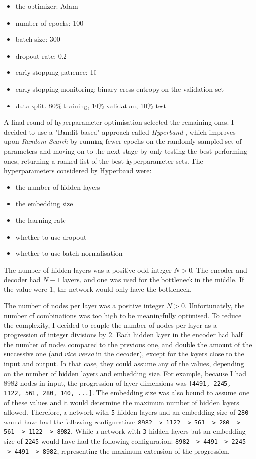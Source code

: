 \begin{itemize}
  \item the optimizer: Adam
  \item number of epochs: 100
  \item batch size: 300
  \item dropout rate: 0.2
  \item early stopping patience: 10
  \item early stopping monitoring: binary cross-entropy on the validation set
  \item data split: 80\% training, 10\% validation, 10\% test
\end{itemize}

A final round of hyperparameter optimisation selected the remaining ones.
I decided to use a "Bandit-based" approach
called \textit{Hyperband} \cite{DBLP:journals/corr/LiJDRT16}, which improves upon \textit{Random Search}
by running fewer epochs on the randomly sampled set of parameters
and moving on to the next stage by only testing the best-performing ones, returning a ranked list of the best hyperparameter sets.
The hyperparameters considered by Hyperband were:

\begin{itemize}
  \item the number of hidden layers
  \item the embedding size
  \item the learning rate
  \item whether to use dropout
  \item whether to use batch normalisation
\end{itemize}

The number of hidden layers was a positive odd integer $N > 0$.
The encoder and decoder had $N-1$ layers, and one was used for the bottleneck in the middle.
If the value were $1$, the network would only have the bottleneck.

The number of nodes per layer was a positive integer $N > 0$. Unfortunately, the number of combinations was too high to be
meaningfully optimised. To reduce the complexity, I decided to couple the number of nodes per layer as a progression
of integer divisions by 2.
Each hidden layer in the encoder had half the number of nodes compared to the previous one, and double the amount of the successive one
(and \textit{vice versa} in the decoder), except for the layers close to the input and output.
In that case, they could assume any of the values, depending on the number of hidden layers and embedding size.
For example, because I had 8982 nodes in input, the progression of layer dimensions
was \verb|[4491, 2245, 1122, 561, 280, 140, ...]|.
The embedding size was also bound to assume one of these values and it would determine
the maximum number of hidden layers allowed.
Therefore, a network with \verb|5| hidden layers and an embedding size of \verb|280|
would have had the following configuration: \verb|8982 -> 1122 -> 561 -> 280 -> 561 -> 1122 -> 8982|.
While a network with \verb|3| hidden layers but an embedding size of \verb|2245| would have had the following configuration:
\verb|8982 -> 4491 -> 2245 -> 4491 -> 8982|, representing the maximum extension of the progression.

